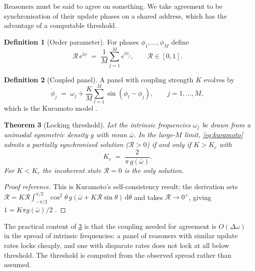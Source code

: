 \documentclass[11pt,twocolumn,a4paper]{article}
\theoremstyle{plain}
\newtheorem{theorem}{Theorem}[section]
\theoremstyle{definition}
\newtheorem{definition}[theorem]{Definition}
\theoremstyle{remark}
\begin{document}
Reasoners must be said to agree on something. We take agreement to be
synchronisation of their update phases on a shared address, which has the
advantage of a computable threshold.

\begin{definition}[Order parameter]
\label{def:order}
For phases $\phi_1,\dots,\phi_M$ define
\begin{equation}
\mathcal{R}\,e^{\mathrm{i}\psi} \;=\; \frac{1}{M}\sum_{j=1}^{M} e^{\mathrm{i}\phi_j},
\qquad \mathcal{R}\in[0,1].
\label{eq:order}
\end{equation}
\end{definition}

\begin{definition}[Coupled panel]
\label{def:kuramoto}
A panel with coupling strength $K$ evolves by
\begin{equation}
\dot\phi_j \;=\; \omega_j + \frac{K}{M}\sum_{l=1}^{M}\sin(\phi_l-\phi_j),
\qquad j = 1,\dots,M,
\label{eq:kuramoto}
\end{equation}
which is the Kuramoto model \citep{Kuramoto1975,Acebron2005}.
\end{definition}

\begin{theorem}[Locking threshold]
\label{thm:lock}
Let the intrinsic frequencies $\omega_j$ be drawn from a unimodal symmetric
density $g$ with mean $\bar\omega$. In the large-$M$ limit,
\cref{eq:kuramoto} admits a partially synchronised solution
($\mathcal{R}>0$) if and only if $K > K_c$ with
\begin{equation}
K_c \;=\; \frac{2}{\pi\,g(\bar\omega)} .
\label{eq:Kc}
\end{equation}
For $K<K_c$ the incoherent state $\mathcal{R}=0$ is the only solution.
\end{theorem}

\begin{proof}[Proof reference]
This is Kuramoto's self-consistency result; the derivation sets
$\mathcal{R} = K\mathcal{R}\int_{-\pi/2}^{\pi/2}\cos^2\theta\,
g(\bar\omega + K\mathcal{R}\sin\theta)\,\mathrm{d}\theta$
and takes $\mathcal{R}\to0^{+}$, giving $1 = K\pi g(\bar\omega)/2$
\citep{Kuramoto1975,Strogatz2000}.
\end{proof}

The practical content of \cref{thm:lock} is that the coupling needed for
agreement is $O(\Delta\omega)$ in the spread of intrinsic frequencies: a panel
of reasoners with similar update rates locks cheaply, and one with disparate
rates does not lock at all below threshold. The threshold is computed from the
observed spread rather than assumed.
\end{document}
